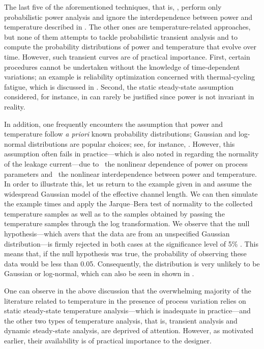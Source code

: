 The last five of the aforementioned techniques, that is, \cite{bhardwaj2006,
vrudhula2006, ghanta2006, bhardwaj2008, shen2009}, perform only probabilistic
power analysis and ignore the interdependence between power and temperature
described in . The other ones are temperature-related
approaches, but none of them attempts to tackle probabilistic transient analysis
and to compute the probability distributions of power and temperature that
evolve over time. However, such transient curves are of practical importance.
First, certain procedures cannot be undertaken without the knowledge of
time-dependent variations; an example is reliability optimization concerned with
thermal-cycling fatigue, which is discussed in .
Second, the static steady-state assumption considered, for instance, in
\cite{huang2009a, juan2011, juan2012, lee2013} can rarely be justified since
power is not invariant in reality.

In addition, one frequently encounters the assumption that power and temperature
follow \emph{a priori} known probability distributions; Gaussian and log-normal
distributions are popular choices; see, for instance, \cite{bhardwaj2006,
srivastava2010, juan2012}. However, this assumption often fails in
practice---which is also noted in \cite{juan2012} regarding the normality of the
leakage current---due to \one~the nonlinear dependence of power on process
parameters and \two~the nonlinear interdependence between power and temperature.
In order to illustrate this, let us return to the example given in
 and assume the widespread Gaussian model of the
effective channel length. We can then simulate the example  times
and apply the Jarque--Bera test of normality to the collected temperature
samples as well as to the samples obtained by passing the temperature samples
through the log transformation. We observe that the null hypothesis---which
avers that the data are from an unspecified Gaussian distribution---is firmly
rejected in both cases at the significance level of 5\% \cite{rao2002}. This
means that, if the null hypothesis was true, the probability of observing these
data would be less than 0.05. Consequently, the distribution is very unlikely to
be Gaussian or log-normal, which can also be seen in
 shown in .

One can observe in the above discussion that the overwhelming majority of the
literature related to temperature in the presence of process variation relies on
static steady-state temperature analysis---which is inadequate in practice---and
the other two types of temperature analysis, that is, transient analysis and
dynamic steady-state analysis, are deprived of attention. However, as motivated
earlier, their availability is of practical importance to the designer.

